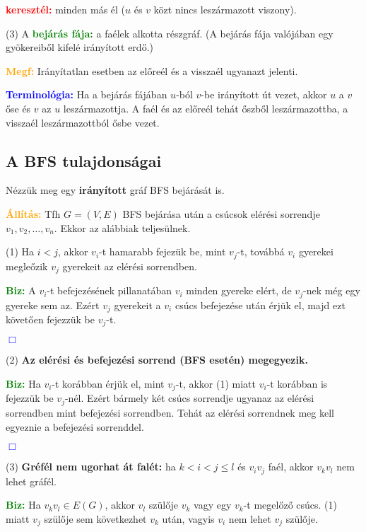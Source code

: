 \documentclass[12pt]{article}
\begin{document}
			\textbf{\textcolor{red}{keresztél:}} minden más él ($u$ és $v$ közt nincs leszármazott viszony).

			(3) A \textbf{\textcolor{green}{bejárás fája:}} a faélek alkotta részgráf. (A bejárás fája valójában egy gyökereiből kifelé irányított erdő.)

			\textbf{\textcolor{orange}{Megf:}} Irányítatlan esetben az előreél és a visszaél ugyanazt jelenti.

			\textbf{\textcolor{blue}{Terminológia:}} Ha a bejárás fájában $u$-ból $v$-be irányított út vezet, akkor $u$ a $v$ őse és $v$ az $u$ leszármazottja. A faél és az előreél tehát őszből leszármazottba, a visszaél leszármazottból ősbe vezet.

		\subsection{A BFS tulajdonságai}
			
			Nézzük meg egy \textbf{irányított} gráf BFS bejárását is.

			\textbf{\textcolor{Orange}{Állítás:}} Tfh $G=(V,E)$ BFS bejárása után a csúcsok elérési sorrendje $v_1,v_2,\dots,v_n$. Ekkor az alábbiak teljesülnek.

			(1) Ha $i < j$, akkor $v_i$-t hamarabb fejezük be, mint $v_j$-t, továbbá $v_i$ gyerekei megleőzik $v_j$ gyerekeit az elérési sorrendben.

			\textbf{\textcolor{green}{Biz:}} A $v_i$-t befejezésének pillanatában $v_i$ minden gyereke elért, de $v_j$-nek még egy gyereke sem az. Ezért $v_j$ gyerekeit a $v_i$ csúcs befejezése után érjük el, majd ezt követően fejezzük be $v_j$-t. \raggedright \textcolor{blue}{$\Box$} 

			(2) \textbf{Az elérési és befejezési sorrend (BFS esetén) megegyezik.}

			\textbf{\textcolor{green}{Biz:}} Ha $v_i$-t korábban érjük el, mint $v_j$-t, akkor (1) miatt $v_i$-t korábban is fejezzük be $v_j$-nél. Ezért bármely két csúcs sorrendje ugyanaz az elérési sorrendben mint befejezési sorrendben. Tehát az elérési sorrendnek meg kell egyeznie a befejezési sorrenddel. \raggedright \textcolor{blue}{$\Box$} 

			(3) \textbf{Gréfél nem ugorhat át falét:} ha $k < i < j \leq l$ és  $v_i v_j$ faél, akkor $v_k v_l$ nem lehet gráfél.

			\textbf{\textcolor{green}{Biz:}} Ha $v_k v_l \in E(G)$, akkor $v_l$ szülője $v_k$ vagy egy $v_k$-t megelőző csúcs. (1) miatt $v_j$ szülője sem következhet $v_k$ után, vagyis $v_i$ nem lehet $v_j$ szülője.
\end{document}
